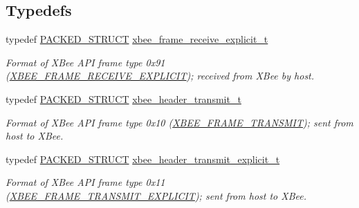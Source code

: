 \subsection*{Typedefs}
\begin{DoxyCompactItemize}
\item 
typedef \hyperlink{group___s_x_a_ga4233297bd31be5c273d4fb0758cc54d7}{P\+A\+C\+K\+E\+D\+\_\+\+S\+T\+R\+U\+CT} \hyperlink{group__xbee__wpan_gad36b64f2e729281d8b7704f6e9906e82}{xbee\+\_\+frame\+\_\+receive\+\_\+explicit\+\_\+t}
\begin{DoxyCompactList}\small\item\em Format of X\+Bee A\+PI frame type 0x91 (\hyperlink{group__xbee__device_gga7753bbebaf00d6d64942f64b6ae9b7b9a8f80b5fa338b8bf34888ffcbfd260a54}{X\+B\+E\+E\+\_\+\+F\+R\+A\+M\+E\+\_\+\+R\+E\+C\+E\+I\+V\+E\+\_\+\+E\+X\+P\+L\+I\+C\+IT}); received from X\+Bee by host. \end{DoxyCompactList}\item 
typedef \hyperlink{group___s_x_a_ga4233297bd31be5c273d4fb0758cc54d7}{P\+A\+C\+K\+E\+D\+\_\+\+S\+T\+R\+U\+CT} \hyperlink{group__xbee__wpan_ga02e02911588cbafc0befb9b9da8961e6}{xbee\+\_\+header\+\_\+transmit\+\_\+t}
\begin{DoxyCompactList}\small\item\em Format of X\+Bee A\+PI frame type 0x10 (\hyperlink{group__xbee__device_gga7753bbebaf00d6d64942f64b6ae9b7b9a5215c258e8db6c292b9e52ca26011ed1}{X\+B\+E\+E\+\_\+\+F\+R\+A\+M\+E\+\_\+\+T\+R\+A\+N\+S\+M\+IT}); sent from host to X\+Bee. \end{DoxyCompactList}\item 
typedef \hyperlink{group___s_x_a_ga4233297bd31be5c273d4fb0758cc54d7}{P\+A\+C\+K\+E\+D\+\_\+\+S\+T\+R\+U\+CT} \hyperlink{group__xbee__wpan_gac2df4f67492506916726d8002ca5f2bd}{xbee\+\_\+header\+\_\+transmit\+\_\+explicit\+\_\+t}
\begin{DoxyCompactList}\small\item\em Format of X\+Bee A\+PI frame type 0x11 (\hyperlink{group__xbee__device_gga7753bbebaf00d6d64942f64b6ae9b7b9aa673474f9f3597929def38ad4cf7d63e}{X\+B\+E\+E\+\_\+\+F\+R\+A\+M\+E\+\_\+\+T\+R\+A\+N\+S\+M\+I\+T\+\_\+\+E\+X\+P\+L\+I\+C\+IT}); sent from host to X\+Bee. \end{DoxyCompactList}\end{DoxyCompactItemize}
